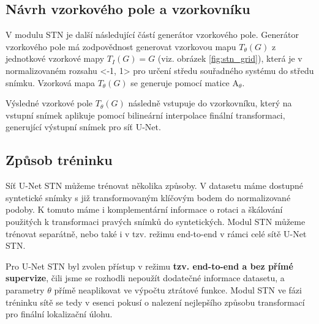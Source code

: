 \subsection{Návrh vzorkového pole a vzorkovníku}

V modulu STN je další následující částí generátor vzorkového pole. Generátor vzorkového pole má zodpovědnost generovat vzorkovou mapu $T_{\theta}(G)$ z jednotkové vzorkové mapy $T_{I}(G) = G$ (viz. obrázek \ref{fig:stn_grid}), která je v normalizovaném rozsahu <-1, 1> pro určení středu souřadného systému do středu snímku. Vzorková mapa $T_{\theta}(G)$ se generuje pomocí matice $\displaystyle \mathrm {A}_\theta$. 

Výsledné vzorkové pole $T_{\theta}(G)$ následně vstupuje do vzorkovníku, který na vstupní snímek aplikuje pomocí bilineární interpolace finální transformaci, generující výstupní snímek pro síť U-Net.

\subsection{Způsob tréninku}

Síť U-Net STN můžeme trénovat několika způsoby. V datasetu máme dostupné syntetické snímky s již transformovaným klíčovým bodem do normalizované podoby. K tomuto máme i komplementární informace o rotaci a škálování použitých k transformaci pravých snímků do syntetických. Modul STN můžeme trénovat separátně, nebo také i v tzv. režimu end-to-end v rámci celé sítě U-Net STN.

Pro U-Net STN byl zvolen přístup v režimu \textbf{tzv. end-to-end a bez přímé supervize}, čili jsme se rozhodli nepoužít dodatečné informace datasetu, a parametry $\theta$ přímě neaplikovat ve výpočtu ztrátové funkce. Modul STN ve fázi tréninku sítě se tedy v esenci pokusí o nalezení nejlepšího způsobu transformací pro finální lokalizační úlohu.

\endinput